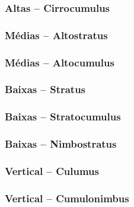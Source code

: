 \begin{frame}
\frametitle{Altas -- Cirrocumulus}
  \begin{center}
  \end{center}
\end{frame}

\begin{frame}
\frametitle{Médias -- Altostratus}
  \begin{center}
  \end{center}
\end{frame}

\begin{frame}
\frametitle{Médias -- Altocumulus}
  \begin{center}
  \end{center}
\end{frame}


\begin{frame}
\frametitle{Baixas -- Stratus}
  \begin{center}
  \end{center}
\end{frame}

\begin{frame}
\frametitle{Baixas -- Stratocumulus}
  \begin{center}
  \end{center}
\end{frame}

\begin{frame}
\frametitle{Baixas -- Nimbostratus}
  \begin{center}
  \end{center}
\end{frame}

\begin{frame}
\frametitle{Vertical -- Culumus}
  \begin{center}
  \end{center}
\end{frame}

\begin{frame}
\frametitle{Vertical -- Cumulonimbus}
  \begin{center}
  \end{center}
\end{frame}

